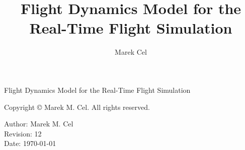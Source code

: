 \documentclass[12pt,a4paper]{report}
\title{Flight Dynamics Model for the Real-Time Flight Simulation}
\author{Marek Cel}
\date{}
\begin{document}
  
  \begin{titlepage}
    \centering
    {\huge Flight Dynamics Model for the Real-Time Flight Simulation\par}
  \end{titlepage}
  

  \noindent Copyright \copyright{} \the\year{} Marek M. Cel. All rights reserved.

  \noindent Author: Marek M. Cel \\
  Revision: 12 \\
  Date: \today

  
  
  {
    \clearpage
    \setlength{\parskip}{0em}
    \tableofcontents
  }

  
  
  
  
  
  
  
  
  
  \clearpage
   
  
  
\end{document}

